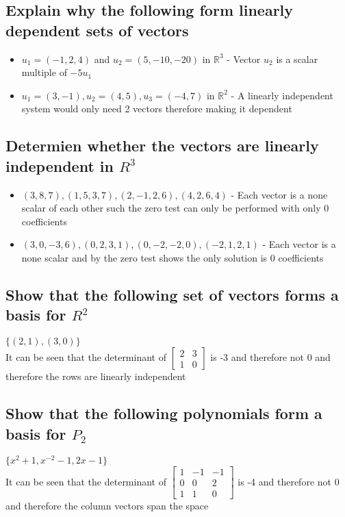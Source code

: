 \documentclass[12pt, a4paper]{article}
\begin{document}
		\subsection{Explain why the following form linearly dependent sets of vectors}
			\begin{itemize}
				\item $u_1=(-1,2,4)$ and $u_2=(5,-10,-20)$ in $\mathbb{R}^3$ - Vector $u_2$ is a scalar multiple of $-5u_1$
				\item $u_1=(3,-1),u_2=(4,5),u_3=(-4,7)$ in $\mathbb{R}^2$ - A linearly independent system would only need 2 vectors therefore making it dependent
			\end{itemize}
		\subsection{Determien whether the vectors are linearly independent in $R^3$}
			\begin{itemize}
				\item $(3,8,7),(1,5,3,7),(2,-1,2,6),(4,2,6,4)$ - Each vector is a none scalar of each other such the zero test can only be performed with only 0 coefficients
				\item $(3,0,-3,6),(0,2,3,1),(0,-2,-2,0),(-2,1,2,1)$ - Each vector is a none scalar and by the zero test shows the only solution is 0 coefficients
			\end{itemize}
		\subsection{Show that the following set of vectors forms a basis for $R^2$}
			$\{(2,1),(3,0)\}$\\
			It can be seen that the determinant of $\begin{bmatrix} 2 & 3 \\ 1 & 0 \end{bmatrix}$ is -3 and therefore not 0 and therefore the rows are linearly independent
		\subsection{Show that the following polynomials form a basis for $P_2$}
			$\{x^2+1,x^{-2}-1, 2x-1\}$\\
			It can be seen that the determinant of $\begin{bmatrix} 1 & -1 & -1 \\ 0 & 0 & 2\\ 1 & 1 & 0 \end{bmatrix}$ is -4 and therefore not 0 and therefore the column vectors span the space
\end{document}
